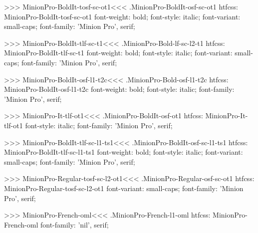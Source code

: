 {>>>
\<MinionPro-BoldIt-tosf-sc-ot1\><<<
.MinionPro-BoldIt-osf-sc-ot1
htfcss:  MinionPro-BoldIt-tosf-sc-ot1  font-weight: bold; font-style: italic; font-variant: small-caps; font-family: 'Minion Pro', serif;

>>>
\<MinionPro-BoldIt-tlf-sc-t1\><<<
.MinionPro-Bold-lf-sc-l2-t1
htfcss:  MinionPro-BoldIt-tlf-sc-t1  font-weight: bold; font-style: italic; font-variant: small-caps; font-family: 'Minion Pro', serif;

>>>
\<MinionPro-BoldIt-osf-l1-t2c\><<<
.MinionPro-Bold-osf-l1-t2c
htfcss:  MinionPro-BoldIt-osf-l1-t2c  font-weight: bold; font-style: italic; font-family: 'Minion Pro', serif;

>>>
\<MinionPro-It-tlf-ot1\><<<
.MinionPro-BoldIt-osf-ot1
htfcss:  MinionPro-It-tlf-ot1  font-style: italic; font-family: 'Minion Pro', serif;

>>>
\<MinionPro-BoldIt-tlf-sc-l1-ts1\><<<
.MinionPro-BoldIt-osf-sc-l1-ts1
htfcss:  MinionPro-BoldIt-tlf-sc-l1-ts1  font-weight: bold; font-style: italic; font-variant: small-caps; font-family: 'Minion Pro', serif;

>>>
\<MinionPro-Regular-tosf-sc-l2-ot1\><<<
.MinionPro-Regular-osf-sc-ot1
htfcss:  MinionPro-Regular-tosf-sc-l2-ot1  font-variant: small-caps; font-family: 'Minion Pro', serif;

>>>
\<MinionPro-French-oml\><<<
.MinionPro-French-l1-oml
htfcss:  MinionPro-French-oml  font-family: 'nil', serif;

}
